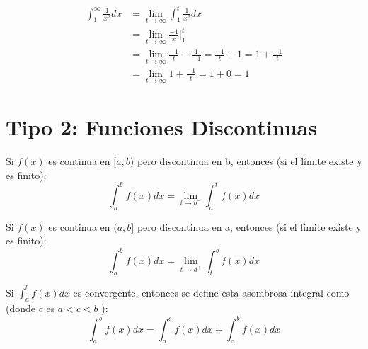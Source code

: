 \documentclass[12pt]{report}                                    %
\begin{document}
        \begin{equation*}
        \begin{split}
            \int_1^{\infty} \frac{1}{x^2} dx & = \lim_{t \to \infty} \int_1^t \frac{1}{x^2} dx \\
            & = \lim_{t \to \infty} \frac{-1}{x} \big\rvert_{1}^{t} \\
            & = \lim_{t \to \infty} \frac{-1}{t} - \frac{1}{-1} = \frac{-1}{t} + 1 = 1 + \frac{-1}{t} \\
            & = \lim_{t \to \infty} 1 + \frac{-1}{t} = 1 + 0 = 1
        \end{split}
        \end{equation*}

        \clearpage

    \clearpage
    \section{Tipo 2: Funciones Discontinuas}

        Si $f(x)$ es continua en $[a, b)$  pero discontinua en b, entonces
        (si el límite existe y es finito):
        \begin{equation}
            \int_a^b f(x) dx = \lim_{t \to b^-} \int_a^t f(x) dx
        \end{equation}

        Si $f(x)$ es continua en $(a, b]$  pero discontinua en a, entonces
        (si el límite existe y es finito):
        \begin{equation}
            \int_a^b f(x) dx = \lim_{t \to a^+} \int_t^b f(x) dx
        \end{equation}



        Si $\int_a^bf(x)dx$ es convergente, entonces se define esta asombrosa integral
        como (donde $c$ es $a<c<b$ ):
        \begin{equation}
            \int_a^b f(x) dx = \int_a^c f(x) dx + \int_c^b f(x) dx  
        \end{equation}
\end{document}
